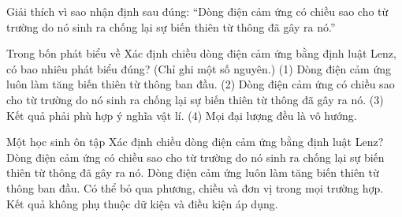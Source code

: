 \begin{bt}
Giải thích vì sao nhận định sau đúng: “Dòng điện cảm ứng có chiều sao cho từ trường do nó sinh ra chống lại sự biến thiên từ thông đã gây ra nó.”
\end{bt}

\begin{ex}
Trong bốn phát biểu về Xác định chiều dòng điện cảm ứng bằng định luật Lenz, có bao nhiêu phát biểu đúng? (Chỉ ghi một số nguyên.) (1) Dòng điện cảm ứng luôn làm tăng biến thiên từ thông ban đầu. (2) Dòng điện cảm ứng có chiều sao cho từ trường do nó sinh ra chống lại sự biến thiên từ thông đã gây ra nó. (3) Kết quả phải phù hợp ý nghĩa vật lí. (4) Mọi đại lượng đều là vô hướng.
\end{ex}

\begin{ex}
Một học sinh ôn tập Xác định chiều dòng điện cảm ứng bằng định luật Lenz?
\choice
{\True Dòng điện cảm ứng có chiều sao cho từ trường do nó sinh ra chống lại sự biến thiên từ thông đã gây ra nó.}
{Dòng điện cảm ứng luôn làm tăng biến thiên từ thông ban đầu.}
{Có thể bỏ qua phương, chiều và đơn vị trong mọi trường hợp.}
{Kết quả không phụ thuộc dữ kiện và điều kiện áp dụng.}
\end{ex}

